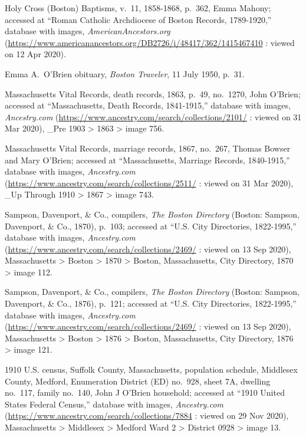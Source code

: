 \begin{thebibliography}{999}
Holy Cross (Boston) Baptisms, v.\ 11, 1858-1868, p.\ 362, Emma Mahony; accessed at ``Roman Catholic Archdiocese of Boston Records, 1789-1920,'' database with images, \textit{AmericanAncestors.org} (\url{https://www.americanancestors.org/DB2726/i/48417/362/1415467410} : viewed on 12 Apr 2020).

Emma A.\ O'Brien obituary, \textit{Boston Traveler}, 11 July 1950, p.\ 31.

Massachusetts Vital Records, death records, 1863, p.\ 49, no.\ 1270, John O'Brien; accessed at ``Massachusetts, Death Records, 1841-1915,'' database with images, \textit{Ancestry.com} (\url{https://www.ancestry.com/search/collections/2101/} : viewed on 31 Mar 2020), \_Pre 1903 > 1863 > image 756.

Massachusetts Vital Records, marriage records, 1867, no.\ 267, Thomas Bowser and Mary O'Brien; accessed at ``Massachusetts, Marriage Records, 1840-1915,'' database with images, \textit{Ancestry.com} (\url{https://www.ancestry.com/search/collections/2511/} : viewed on 31 Mar 2020), \_Up Through 1910 > 1867 > image 743.

Sampson, Davenport, \& Co., compilers, \textit{The Boston Directory} (Boston: Sampson, Davenport, \& Co., 1870), p.\ 103; accessed at ``U.S. City Directories, 1822-1995,'' database with images, \textit{Ancestry.com} (\url{https://www.ancestry.com/search/collections/2469/} : viewed on 13 Sep 2020), Massachusetts > Boston > 1870 > Boston, Massachusetts, City Directory, 1870 > image 112.

Sampson, Davenport, \& Co., compilers, \textit{The Boston Directory} (Boston: Sampson, Davenport, \& Co., 1876), p.\ 121; accessed at ``U.S. City Directories, 1822-1995,'' database with images, \textit{Ancestry.com} (\url{https://www.ancestry.com/search/collections/2469/} : viewed on 13 Sep 2020), Massachusetts > Boston > 1876 > Boston, Massachusetts, City Directory, 1876 > image 121.

1910 U.S. census, Suffolk County, Massachusetts, population schedule, Middlesex County, Medford, Enumeration District (ED) no.\ 928, sheet 7A, dwelling no.\ 117, family no.\ 140, John J O'Brien household; accessed at ``1910 United States Federal Census,'' database with images, \textit{Ancestry.com} (\url{https://www.ancestry.com/search/collections/7884} : viewed on 29 Nov 2020), Massachusetts > Middlesex > Medford Ward 2 > District 0928 > image 13.


\end{thebibliography}
